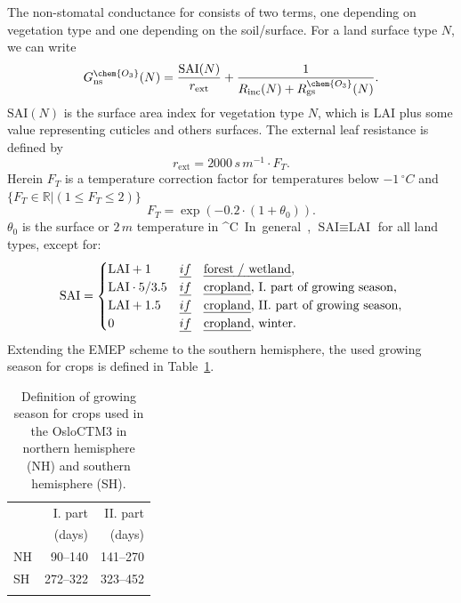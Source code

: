 \documentclass[gmd, manuscript]{copernicus}
\begin{document}
The non-stomatal conductance for  consists of two terms, one depending on vegetation type and one depending on the soil/surface. For a land surface type $N$, we can write
\begin{equation}
  G_\text{ns}^\chem{O_3}(N) = \frac{\text{SAI}(N)}{r_\text{ext}} + \frac{1}{R_\text{inc}(N) + R_\text{gs}^\chem{O_3}(N)}.
  \label{eq:non-stomata-cond}
\end{equation}
$\text{SAI}(N)$ is the surface area index for vegetation type $N$, which is $\text{LAI}$ plus some value representing cuticles and others surfaces. The external leaf resistance is defined by
\begin{equation}
  r_\text{ext} = 2000\,\unit{s\,m^{-1}}\cdot F_T.
\end{equation}
Herein $F_T$ is a temperature correction factor for temperatures below $-1\,\unit{^\circ C}$ and $\{F_T \in \mathbb{R} | (1 \leq F_T \leq 2)\}$
\begin{equation}
  F_T = \exp{(-0.2\cdot(1+\theta_0))}.
\end{equation}
$\theta_0$ is the surface or $2\,\unit{m}$ temperature in \unit{^\circ C}. In general, $\text{SAI} \equiv \text{LAI}$ for all land types, except for: 
%
\begin{equation}
  \text{SAI} = 
  \begin{cases}
    \text{LAI}+1 & \emph{if} \quad \text{\emph{forest / wetland}},\\
    \text{LAI}\cdot 5/3.5 & \emph{if} \quad \text{\emph{cropland}, I. part of growing season},\\
    \text{LAI} + 1.5 & \emph{if} \quad \text{\emph{cropland}, II. part of growing season},\\
    0 & \emph{if} \quad \text{\emph{cropland}, winter}.
  \end{cases}
  \label{eq:SAI}
\end{equation}
%
Extending the EMEP scheme to the southern hemisphere, the used growing season for crops is defined in Table~\ref{tab:growing_season}.
%
\begin{table}[t]
  \caption{Definition of growing season for crops used in the OsloCTM3 in northern hemisphere (NH) and southern hemisphere (SH).}
  \begin{tabular}{lrr}
    \tophline
    & I. part & II. part \\
    & (days) & (days) \\
    \middlehline
    NH & 90--140 & 141--270 \\
    SH & 272--322 & 323--452 \\
    \bottomhline
  \end{tabular}
  \label{tab:growing_season}
\end{table}
%
\end{document}
